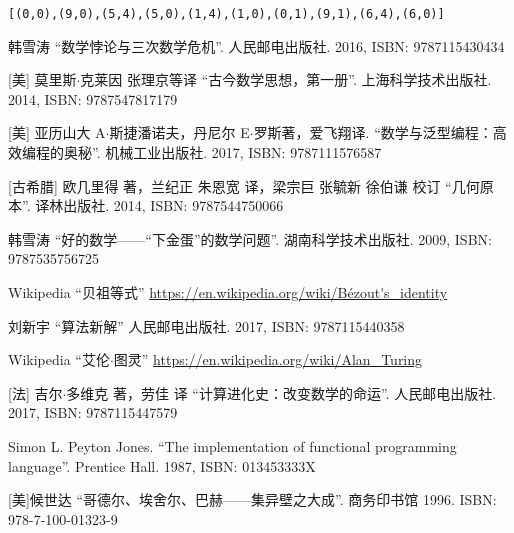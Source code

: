 \documentclass[UTF8]{article}
\begin{document}
\begin{verbatim}
[(0,0),(9,0),(5,4),(5,0),(1,4),(1,0),(0,1),(9,1),(6,4),(6,0)]
\end{verbatim}

\ifx\wholebook\relax \else
\begin{thebibliography}{99}

韩雪涛 ``数学悖论与三次数学危机''. 人民邮电出版社. 2016, ISBN: 9787115430434

[美] 莫里斯$\cdot$克莱因 张理京等译 ``古今数学思想，第一册''. 上海科学技术出版社. 2014, ISBN: 9787547817179

[美] 亚历山大 A$\cdot$斯捷潘诺夫，丹尼尔 E$\cdot$罗斯著，爱飞翔译. ``数学与泛型编程：高效编程的奥秘''. 机械工业出版社. 2017, ISBN: 9787111576587

[古希腊] 欧几里得 著，兰纪正 朱恩宽 译，梁宗巨 张毓新 徐伯谦 校订 ``几何原本''. 译林出版社. 2014, ISBN: 9787544750066

韩雪涛 ``好的数学——“下金蛋”的数学问题''. 湖南科学技术出版社. 2009, ISBN: 9787535756725

Wikipedia ``贝祖等式'' \url{https://en.wikipedia.org/wiki/Bézout's_identity}

刘新宇 ``算法新解'' 人民邮电出版社. 2017, ISBN: 9787115440358

Wikipedia ``艾伦$\cdot$图灵'' \url{https://en.wikipedia.org/wiki/Alan_Turing}

[法] 吉尔$\cdot$多维克 著，劳佳 译 ``计算进化史：改变数学的命运''. 人民邮电出版社. 2017, ISBN: 9787115447579

Simon L. Peyton Jones. ``The implementation of functional programming language''. Prentice Hall. 1987, ISBN: 013453333X

[美]候世达 ``哥德尔、埃舍尔、巴赫——集异壁之大成''. 商务印书馆 1996. ISBN: 978-7-100-01323-9

\end{thebibliography}

\expandafter\enddocument

\fi
\end{document}
